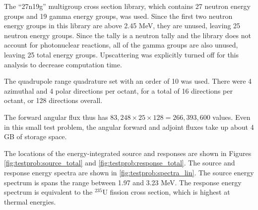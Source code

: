 The ``27n19g'' multigroup cross section library, which contains 27 neutron energy groups and 19 gamma energy groups, was used.
Since the first two neutron energy groups in this library are above 2.45 MeV, they are unused, leaving 25 neutron energy groups.
Since the tally is a neutron tally and the library does not account for photonuclear reactions, all of the gamma groups are also unused, leaving 25 total energy groups.
Upscattering was explicitly turned off for this analysis to decrease computation time.

The quadrupole range quadrature set with an order of 10 was used.
There were 4 azimuthal and 4 polar directions per octant, for a total of 16 directions per octant, or 128 directions overall.

The forward angular flux thus has $83,248 \times 25 \times 128 = 266,393,600$ values.
Even in this small test problem, the angular forward and adjoint fluxes take up about 4 GB of storage space.

The locations of the energy-integrated source and responses are shown in Figures \ref{fig:testprob:source_total} and \ref{fig:testprob:response_total}.
The source and response energy spectra are shown in \ref{fig:testprob:spectra_lin}.
The source energy spectrum is spans the range between 1.97 and 3.23 MeV.
The response energy spectrum is equivalent to the ${}^{235}\text{U}$ fission cross section, which is highest at thermal energies.

